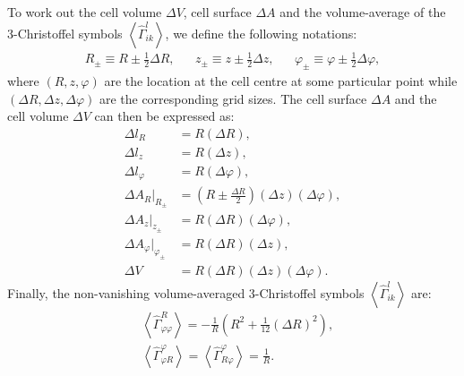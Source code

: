 To work out the cell volume $\Delta V$, cell surface $\Delta A$ and the volume-average of the 3-Christoffel symbols $\left< \hat{\Gamma}^l_{ik}\right>$, we define the following notations: 
\begin{align}
&R_\pm \equiv R \pm \frac{1}{2}\Delta R,&
&z_\pm \equiv z \pm \frac{1}{2}\Delta z,& 
&\varphi_\pm \equiv \varphi \pm \frac{1}{2}\Delta \varphi ,&
\end{align}
where $(R,z,\varphi)$ are the location at the cell centre at some particular point while $(\Delta R,\Delta z,\Delta \varphi)$ are the corresponding grid sizes.
The cell surface $\Delta A$ and the cell volume $\Delta V$ can then be expressed as:
\begin{align}
\Delta l_R &= R \left( \Delta R \right) ,\\
\Delta l_z &= R \left( \Delta z \right) ,\\
\Delta l_\varphi &= R \left( \Delta \varphi \right) ,\\
\Delta A_R\Big|_{R_\pm} &= \left( R \pm \frac{\Delta R}{2} \right) \left( \Delta z \right) \left( \Delta \varphi \right) ,\\
\Delta A_z \Big|_{z_\pm} &= R \left( \Delta R \right) \left( \Delta \varphi \right) ,\\
\Delta A_\varphi \Big|_{\varphi_\pm} &= R \left( \Delta R \right) \left( \Delta z \right) ,\\
\Delta V &=  R \left( \Delta R \right) \left( \Delta z \right) \left( \Delta \varphi \right).
\end{align}
Finally, the non-vanishing volume-averaged 3-Christoffel symbols $\left< \hat{\Gamma}^l_{ik}\right>$ are:
\begin{align}
&\left<\hat{\Gamma}^{R}_{\varphi\varphi } \right> = - \frac{1}{R} \left(R^2 + \frac{1}{12}\left(\Delta R\right)^2\right), \\
&\left<\hat{\Gamma}^{\varphi}_{\varphi R} \right> = \left<\hat{\Gamma}^{\varphi}_{R \varphi } \right> = \frac{1}{R}.
\end{align}

